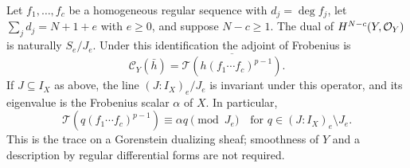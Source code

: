 \begin{lemma}
\label{sci:lem:trace}
Let \(f_1,\ldots,f_c\) be a homogeneous regular sequence with
\(d_j=\deg f_j\), let \(\sum_jd_j=N+1+e\) with \(e\geq0\), and
suppose \(N-c\geq1\).
The dual of \(H^{N-c}(Y,\mathcal O_Y)\) is naturally \(S_e/J_e\). Under this
identification the adjoint of Frobenius is
\[
 \mathcal C_Y(\bar h)
 =\overline{\mathcal T\!\left(h(f_1\cdots f_c)^{p-1}\right)}.
 \label{sci:eq:trace}
\]
If \(J\subseteq I_X\) as above, the line
\((J:I_X)_e/J_e\) is invariant under this operator, and its eigenvalue
is the Frobenius scalar \(\alpha\) of \(X\). In particular,
\[
 \mathcal T\!\left(q(f_1\cdots f_c)^{p-1}\right)
       \equiv\alpha q\pmod{J_e}
 \quad\text{for }q\in(J:I_X)_e\setminus J_e.
\]
This is the trace on a Gorenstein dualizing sheaf; smoothness of \(Y\)
and a description by regular differential forms are not required.
\end{lemma}
